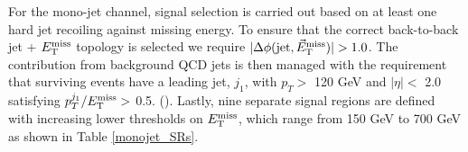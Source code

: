 For the mono-jet channel, signal selection is carried out based on at least one hard jet recoiling against missing energy.  
To ensure that the correct back-to-back jet + $E_{\mathrm{T}}^{\mathrm{miss}}$ topology is selected we require $|\Delta\phi(\mathrm{jet},\metvec)|>1.0$. The contribution from background QCD jets is then managed with the requirement that surviving events have a leading jet, $j_{1}$, with $p_{T} >$ 120 GeV and $|\eta| <$ 2.0 satisfying $p_{T}^{j_{1}}/E_{\mathrm{T}}^{\mathrm{miss}} >$ 0.5. ().  Lastly, nine separate signal regions are defined with increasing lower thresholds on $E_{\mathrm{T}}^{\mathrm{miss}}$, which range from 150 GeV to 700 GeV as shown in Table \ref{monojet_SRs}.


